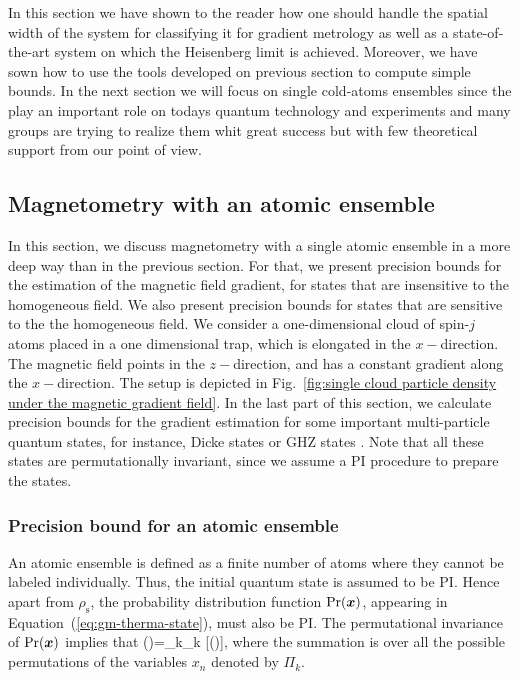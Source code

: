 In this section we have shown to the reader how one should handle the spatial width of the system for classifying it for gradient metrology as well as a state-of-the-art system on which the Heisenberg limit is achieved. Moreover, we have sown how to use the tools developed on previous section to compute simple bounds. In the next section we will focus on single cold-atoms ensembles since the play an important role on todays quantum technology and experiments and many groups are trying to realize them whit great success but with few theoretical support from our point of view.

\subsection{Magnetometry with an atomic ensemble}
\label{sec:gm-single-cloud}

In this section, we discuss magnetometry with a single
atomic ensemble in a more deep way than in the previous section.
For that, we present precision bounds for
the estimation of the magnetic field gradient, for
states that are insensitive to the homogeneous field.
We also present precision bounds for states that are sensitive to the
the homogeneous field.
We consider a one-dimensional cloud of spin-$j$ atoms
placed in a one dimensional trap, which is elongated
in the  $x-$direction.
The magnetic field points in the  $z-$direction,
and has a constant gradient along the $x-$direction.
The setup is depicted
in Fig.~\ref{fig:single cloud particle density under the magnetic gradient field}.
In the last part of this section, we calculate precision bounds for the
gradient estimation for some important multi-particle quantum states,
for instance, Dicke states \cite{} or
GHZ states \cite{Greenberger1990}.
Note that all these states are permutationally invariant, since we
assume a PI procedure to prepare the states.

\subsubsection{Precision bound for an atomic ensemble}

An atomic ensemble is defined as a finite number of atoms where
they cannot be labeled individually.
Thus, the initial quantum state is assumed to be PI.
Hence apart from $\rho_{\text{s}}$, the probability distribution function
$\text{Pr}(\boldsymbol{x})$, appearing in Equation~(\ref{eq:gm-therma-state}),
must also be PI.
The permutational invariance of $\text{Pr}(\boldsymbol{x})$ implies that
\be
\label{eq:gm-pi-for-pdf}
\prob()=\sum_{k}\Pi_k [\prob()],
\ee
where the summation is over all the possible permutations
of the variables $x_n$ denoted by
$\Pi_k.$

